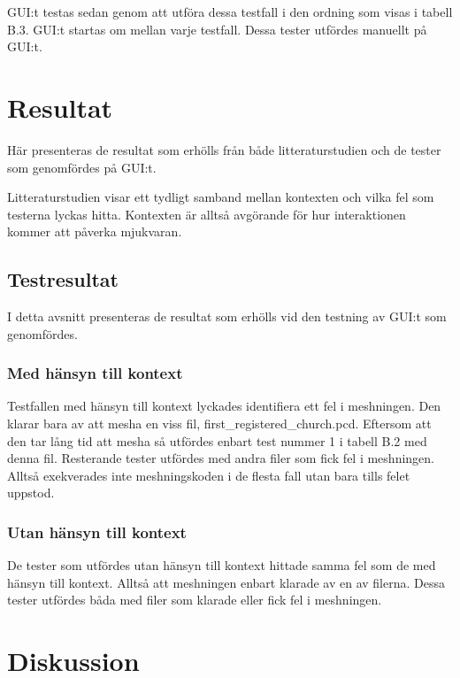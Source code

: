 GUI:t testas sedan genom att utföra dessa testfall i den ordning som visas i tabell B.3. GUI:t startas om mellan varje testfall. Dessa tester utfördes manuellt på GUI:t.

\section{Resultat}
\label{sec:results-holmberg}

Här presenteras de resultat som erhölls från både litteraturstudien och de tester som genomfördes på GUI:t.

Litteraturstudien visar ett tydligt samband mellan kontexten och vilka fel som testerna lyckas hitta. Kontexten är alltså avgörande för hur interaktionen kommer att påverka mjukvaran.

\subsection{Testresultat}

I detta avsnitt presenteras de resultat som erhölls vid den testning av GUI:t som genomfördes.

\subsubsection{Med hänsyn till kontext}

Testfallen med hänsyn till kontext lyckades identifiera ett fel i meshningen. Den klarar bara av att mesha en viss fil, first\_registered\_church.pcd. Eftersom att den tar lång tid att mesha så utfördes enbart test nummer 1 i tabell B.2 med denna fil. Resterande tester utfördes med andra filer som fick fel i meshningen. Alltså exekverades inte meshningskoden i de flesta fall utan bara tills felet uppstod.

\subsubsection{Utan hänsyn till kontext}

De tester som utfördes utan hänsyn till kontext hittade samma fel som de med hänsyn till kontext. Alltså att meshningen enbart klarade av en av filerna. Dessa tester utfördes båda med filer som klarade eller fick fel i meshningen.

\section{Diskussion}
\label{sec:discussion-holmberg}

